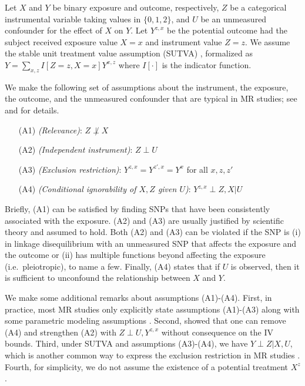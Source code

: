 \documentclass[
]{article}
\providecommand{\tightlist}{%
  \setlength{\itemsep}{0pt}\setlength{\parskip}{0pt}}
\theoremstyle{plain}
\begin{document}
\label{notation-and-definitions}

Let \(X\) and \(Y\) be binary exposure and outcome, respectively, \(Z\) be a categorical instrumental variable taking values in \(\{0, 1, 2\}\), and \(U\) be an unmeasured confounder for the effect of \(X\) on \(Y\). Let \(Y^{z,x}\) be the potential outcome \autocite{rubin_estimating_1974,splawa-neyman_application_1990} had the subject received exposure value \(X = x\) and instrument value \(Z = z\). We assume the stable unit treatment value assumption (SUTVA) \autocite{cox_planning_1958,rubin_randomization_1980}, formalized as \(Y = \sum_{x,z} I[Z = z, X = x] Y^{x,z}\) where \(I[\cdot]\) is the indicator function.

We make the following set of assumptions about the instrument, the exposure, the outcome, and the unmeasured confounder that are typical in MR studies; see \textcite{didelez_mendelian_2007} and \textcite{wang_bounded_2018} for details.

\begin{itemize}
\tightlist
\item[(A1)] \emph{(Relevance)}: $Z \not\perp X$ 
\item[(A2)] \emph{(Independent instrument)}: $Z \perp U$
\item[(A3)] \emph{(Exclusion restriction)}: $Y^{z,x} = Y^{z',x} = Y^{x}$ for all $x,z,z'$
\item[(A4)] \emph{(Conditional ignorability of $X,Z$ given $U$)}: $Y^{z,x} \perp Z, X | U$
\end{itemize}

Briefly, (A1) can be satisfied by finding SNPs that have been consistently associated with the exposure. (A2) and (A3) are usually justified by scientific theory and assumed to hold. Both (A2) and (A3) can be violated if the SNP is (i) in linkage disequilibrium with an unmeasured SNP that affects the exposure and the outcome or (ii) has multiple functions beyond affecting the exposure (i.e.~pleiotropic), to name a few. Finally, (A4) states that if \(U\) is observed, then it is sufficient to unconfound the relationship between \(X\) and \(Y\).

We make some additional remarks about assumptions (A1)-(A4). First, in practice, most MR studies only explicitly state assumptions (A1)-(A3) along with some parametric modeling assumptions \autocite{burgess_mendelian_2015}. Second, \textcite{richardson_ace_2014} showed that one can remove (A4) and strengthen (A2) with \(Z \perp U, Y^{z,x}\) without consequence on the IV bounds. Third, under SUTVA and assumptions (A3)-(A4), we have \(Y \perp Z | X, U\), which is another common way to express the exclusion restriction in MR studies \autocite{didelez_mendelian_2007,swanson_partial_2018}. Fourth, for simplicity, we do not assume the existence of a potential treatment \(X^{z}\).
\end{document}
